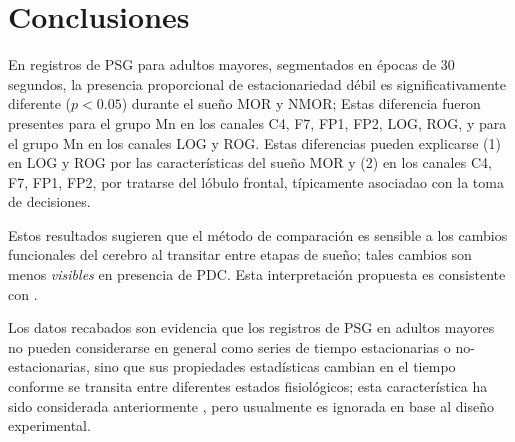 

\section{Conclusiones}

En registros de PSG para adultos mayores, segmentados en épocas de 30 segundos, la presencia 
proporcional de estacionariedad débil es significativamente diferente ($p<0.05$) durante el sueño 
MOR y NMOR;
Estas diferencia fueron presentes para el grupo Mn en los canales C4, F7, FP1, FP2, LOG, ROG, y 
para el grupo Mn en los canales LOG y ROG.
Estas diferencias pueden explicarse 
(1) en LOG y ROG por las características del sueño MOR y
(2) en los canales C4, F7, FP1, FP2, por tratarse del lóbulo frontal, típicamente asociadao con la 
toma de decisiones.


Estos resultados sugieren que el método de comparación es sensible a los cambios funcionales del 
cerebro al transitar entre etapas de sueño; tales cambios son menos \textit{visibles} en presencia
de PDC. Esta interpretación propuesta es consistente con \cite{Valeria}.


Los datos recabados son evidencia que los registros de PSG en adultos mayores no pueden 
considerarse en general como series de tiempo estacionarias o no-estacionarias, sino que sus 
propiedades estadísticas cambian en el tiempo conforme se transita entre diferentes estados 
fisiológicos; 
esta característica ha sido considerada anteriormente \cite{Kaiser00}, pero usualmente es ignorada
en base al diseño experimental.


